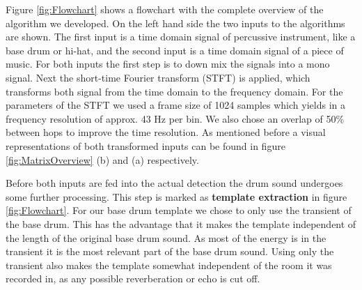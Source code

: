 \documentclass{article}
\begin{document}
Figure \ref{fig:Flowchart} shows a flowchart with the complete overview of the algorithm we developed.
On the left hand side the two inputs to the algorithms are shown.
The first input is a time domain signal of percussive instrument, like a base drum or hi-hat, and the second input is a time domain signal of a piece of music.
For both inputs the first step is to down mix the signals into a mono signal.
Next the short-time Fourier transform (STFT) is applied, which transforms both signal from the time domain to the frequency domain.
For the parameters of the STFT we used a frame size of 1024 samples which yields in a frequency resolution of approx. 43 Hz per bin.
We also chose an overlap of 50\% between hops to improve the time resolution.
As mentioned before a visual representations of both transformed inputs can be found in figure \ref{fig:MatrixOverview} (b) and (a) respectively.

Before both inputs are fed into the actual detection the drum sound undergoes some further processing.
This step is marked as \textbf{template extraction} in figure \ref{fig:Flowchart}.
For our base drum template we chose to only use the transient of the base drum.
This has the advantage that it makes the template independent of the length of the original base drum sound.
As most of the energy is in the transient it is the most relevant part of the base drum sound.
Using only the transient also makes the template somewhat independent of the room it was recorded in, as any possible reverberation or echo is cut off.
\end{document}
